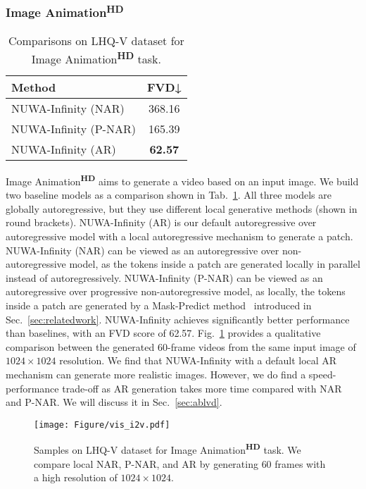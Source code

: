 \documentclass{article}
\begin{document}
\subsubsection{Image Animation\textsuperscript{\textbf{HD}}}
\begin{table}
\centering
\begin{tabular}{lc}
\toprule
Method        & FVD↓           \\
\midrule
NUWA-Infinity (NAR)   &368.16          \\
NUWA-Infinity (P-NAR) & 165.39          \\
NUWA-Infinity (AR) & \textbf{62.57} \\
\bottomrule
\end{tabular}
\caption{Comparisons on LHQ-V dataset for Image Animation\textsuperscript{\textbf{HD}} task.}
\label{tab:i2v_task}
\end{table}
Image Animation\textsuperscript{\textbf{HD}} aims to generate a video based on an input image. We build two baseline models as a comparison shown in Tab.~\ref{tab:i2v_task}. All three models are globally autoregressive, but they use different local generative methods (shown in round brackets). NUWA-Infinity (AR) is our default autoregressive over autoregressive model with a local autoregressive mechanism to generate a patch. NUWA-Infinity (NAR) can be viewed as an autoregressive over non-autoregressive model, as the tokens inside a patch are generated locally in parallel instead of autoregressively. NUWA-Infinity (P-NAR) can be viewed as an autoregressive over progressive non-autoregressive model, as locally, the tokens inside a patch are generated by a Mask-Predict method~\cite{changMaskGITMaskedGenerative2022} introduced in Sec.~\ref{sec:relatedwork}. NUWA-Infinity achieves significantly better performance than baselines, with an FVD score of 62.57. Fig.~\ref{fig:vis_i2v} provides a qualitative comparison between the generated $60$-frame videos from the same input image of $1024\times 1024$ resolution. We find that NUWA-Infinity with a default local AR mechanism can generate more realistic images. However, we do find a speed-performance trade-off as AR generation takes more time compared with NAR and P-NAR. We will discuss it in Sec.~\ref{sec:ablvd}.




\begin{figure}[h]
    \centering
    \texttt{[image: Figure/vis\_i2v.pdf]}
    \caption{Samples on LHQ-V dataset for Image Animation\textsuperscript{\textbf{HD}} task. We compare local NAR, P-NAR, and AR by generating $60$ frames with a high resolution of $1024\times 1024$.}
    \label{fig:vis_i2v}
	\vspace{-3mm}
\end{figure}
\end{document}
